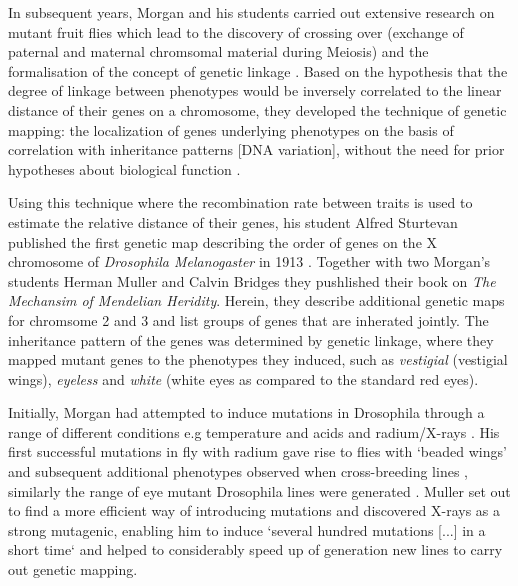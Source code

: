 In subsequent years, Morgan and his students carried out extensive research on mutant fruit flies which lead to the discovery of crossing over (exchange of paternal and maternal chromsomal material during Meiosis) and the formalisation of the concept of genetic linkage \citep{Morgan1911b}. Based on the hypothesis that the degree of linkage between phenotypes would be inversely correlated to the linear distance of their genes on a chromosome, they developed the technique of genetic mapping: the localization of genes underlying phenotypes on the basis of correlation with inheritance patterns [DNA variation], without the need for prior hypotheses about biological function \citep{Altshuler2008}.

Using this technique where the recombination rate between traits is used to estimate the relative distance of their genes, his student Alfred Sturtevan published the first genetic map describing the order of genes on the X chromosome of \textit{Drosophila Melanogaster} in 1913 \citep{Sturtevan1913}. Together with two Morgan's students Herman Muller and Calvin Bridges they pushlished their book on \textit{The Mechansim of Mendelian Heridity}\citep{Morgan2015}. Herein, they describe additional genetic maps for chromsome 2 and 3 and list groups of genes that are inherated jointly. The inheritance pattern of the genes was determined by genetic linkage, where they mapped mutant genes to the phenotypes they induced, such as \textit{vestigial} (vestigial wings), \textit{eyeless} and \textit{white} (white eyes as compared to the standard red eyes). 

Initially, Morgan had attempted to induce mutations in Drosophila through a range of different conditions e.g temperature and acids and radium/X-rays \citep{Sturtevant1959}. His first successful mutations in fly with radium gave rise to flies with `beaded wings' and subsequent additional phenotypes observed when cross-breeding lines \citep{Morgan1911c}, similarly the range of eye mutant Drosophila lines were generated \citep{Morgan1911d}. Muller set out to find a more efficient way of introducing mutations and discovered X-rays as a strong mutagenic, enabling him to induce `several hundred mutations [...] in a short time` \citep{Muller1927} and helped to considerably speed up of generation new lines to carry out genetic mapping. 


